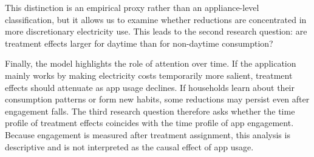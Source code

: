 This distinction is an empirical proxy rather than an appliance-level classification, but it allows us to examine whether reductions are concentrated in more discretionary electricity use. This leads to the second research question: are treatment effects larger for daytime than for non-daytime consumption?

Finally, the model highlights the role of attention over time. If the application mainly works by making electricity costs temporarily more salient, treatment effects should attenuate as app usage declines. If households learn about their consumption patterns or form new habits, some reductions may persist even after engagement falls. The third research question therefore asks whether the time profile of treatment effects coincides with the time profile of app engagement. Because engagement is measured after treatment assignment, this analysis is descriptive and is not interpreted as the causal effect of app usage.